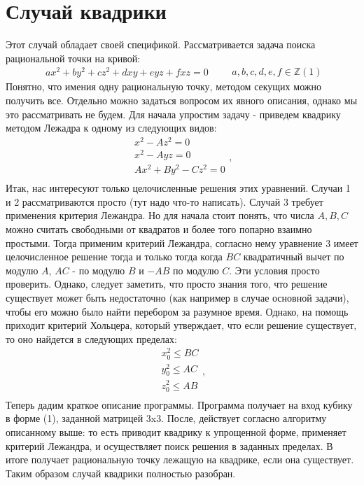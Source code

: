 \section*{Случай квадрики}
Этот случай обладает своей спецификой. Рассматривается задача поиска рациональной точки на кривой:
\newline
\[
\begin{aligned}
	ax^2 + by^2 + cz^2 + dxy + eyz + fxz = 0 
\end{aligned} \qquad a, b, c, d, e, f \in \mathbb{Z}    (1)
\]
Понятно, что имения одну рациональную точку, методом секущих можно получить все. Отдельно можно задаться вопросом их явного описания, однако мы это рассматривать не будем. 
Для начала упростим задачу - приведем квадрику методом Лежадра к одному из следующих видов:
\[
\begin{aligned}
	x^2 - Az^2 = 0 \\
	x^2 - Ayz = 0 \\
	Ax^2 + By^2 - Cz^2 = 0 		\\
\end{aligned} 
,\] 
\newline
Итак, нас интересуют только целочисленные решения этих уравнений. Случаи 1 и 2 рассматриваются просто (тут надо что-то написать). Случай 3 требует применения критерия Лежандра. Но для начала стоит понять, что числа $ A, B, C$ можно считать свободными от квадратов и более того попарно взаимно простыми. Тогда применим критерий Лежандра, согласно нему уравнение 3 имеет целочисленное решение тогда и только тогда когда $BC$ квадратичный вычет по модулю $A$, $AC$ - по модулю $B$ и $-AB$  по модулю $C$. Эти условия просто проверить. Однако, следует заметить, что просто знания того, что решение существует может быть недостаточно (как например в случае основной задачи), чтобы его можно было найти перебором за разумное время. Однако, на помощь приходит критерий Хольцера, который утверждает, что если решение существует, то оно найдется в следующих пределах:
\[
\begin{aligned}
	x_{0}^2 \leqslant BC \\
	y_{0}^2 \leqslant AC \\
	z_{0}^2 \leqslant  AB	\\
\end{aligned} 
,\] 
Теперь дадим краткое описание программы.  Программа получает на вход кубику в форме (1), заданной матрицей 3x3. После, действует согласно алгоритму описанному выше: то есть приводит квадрику к упрощенной форме, применяет критерий Лежандра, и осуществляет поиск решения в заданных пределах. В итоге получает рациональную точку лежащую на квадрике, если она существует. Таким образом случай квадрики полностью разобран.
\newline
\newline

